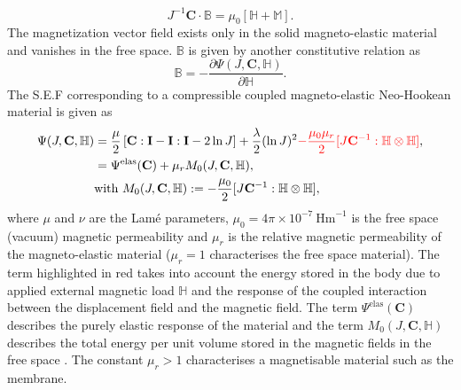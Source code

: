 \begin{equation}
J^{-1} \mathbf{C} \cdot \mathbb{B} = \mu_0 \left[ \mathbb{H} + \mathbb{M} \right].
\label{eq:3.3.2}
\end{equation}
The magnetization vector field exists only in the solid magneto-elastic material and vanishes in the free space. $\mathbb{B}$ is given by another constitutive relation as \cite{dorfmann2004} 
\begin{equation}
\mathbb{B} = -\dfrac{\partial \Psi (J, \mathbf{C}, \mathbb{H})}{\partial \mathbb{H}}.
\label{eq:3.4}
\end{equation}
The S.E.F corresponding to a compressible coupled magneto-elastic Neo-Hookean material is given as 
\begin{align}
\Psi (J, \mathbf{C}, \mathbb{H}) &= \dfrac{\mu}{2} \left[ \mathbf{C} : \mathbf{I} - \mathbf{I} : \mathbf{I} -2 \ln J \right] + \dfrac{\lambda}{2} (\ln J)^2 \textcolor{red}{- \frac{\mu_0 \mu_r}{2} [J \mathbf{C}^{-1} : \mathbb{H} \otimes \mathbb{H}]}, \\
&= \Psi^{\text{elas}} (\mathbf{C}) + \mu_r M_0 (J, \mathbf{C}, \mathbb{H}), \\
& \text{with} \ M_0 (J, \mathbf{C}, \mathbb{H}) := -\frac{\mu_0}{2} [J \mathbf{C}^{-1} : \mathbb{H} \otimes \mathbb{H}],
\label{eq:3.5}
\end{align}
where $\mu$ and $\nu$ are the Lam\'e parameters, $\mu_0 = 4 \pi \times 10^{-7} \ \text{Hm}^{-1}$ is the free space (vacuum) magnetic permeability and $\mu_r$ is the relative magnetic permeability of the magneto-elastic material ($\mu_r = 1$ characterises the free space material). The term highlighted in red takes into account the energy stored in the body due to applied external magnetic load $\mathbb{H}$ and the response of the coupled interaction between the displacement field and the magnetic field. The term $\Psi^{\text{elas}} (\mathbf{C})$ describes the purely elastic response of the material and the term $M_0 (J, \mathbf{C}, \mathbb{H})$ describes the total energy per unit volume stored in the magnetic fields in the free space \cite{dorfmann2004}. The constant $\mu_r > 1$ characterises a magnetisable material such as the membrane. \par 

